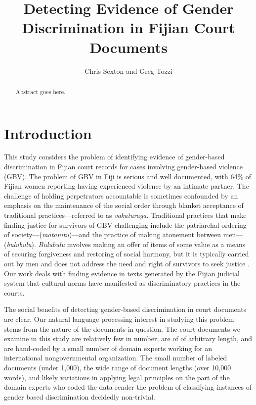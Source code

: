 \documentclass[twocolumn,10pt]{wmrDoc}
\title{Detecting Evidence of Gender Discrimination in Fijian Court Documents}
\author{Chris Sexton and Greg Tozzi
    \affiliation{
    School of Information\\
	University of California, Berkeley\\
    email: cjsexton, greg.tozzi@ischool.berkeley.edu
    }	
}
\begin{document}
\maketitle    
\begin{abstract}
{\it 

Abstract goes here. 

}
\end{abstract}

\section{Introduction}
This study considers the problem of identifying evidence of gender-based discrimination in Fijian court records for cases involving gender-based violence (GBV).  The problem of GBV in Fiji is serious and well documented, with 64\% of Fijian women reporting having experienced violence by an intimate partner.  The challenge of holding perpetrators accountable is sometimes confounded by an emphasis on the maintenance of the social order through blanket acceptance of traditional practices---referred to as \emph{vakaturaga}.  Traditional practices that make finding justice for survivors of GBV challenging include the patriarchal ordering of society---(\emph{matanitu})---and the practice of making atonement between men---(\emph{bulubulu}).  \emph{Bulubulu} involves making an offer of items of some value as a means of securing forgiveness and restoring of social harmony, but it is typically carried out by men and does not address the need and right of survivors to seek justice \cite{newland}.  Our work deals with finding evidence in texts generated by the Fijian judicial system that cultural norms have manifested as discriminatory practices in the courts.

The social benefits of detecting gender-based discrimination in court documents are clear.  Our natural language processing interest in studying this problem stems from the nature of the documents in question.  The court documents we examine in this study are relatively few in number, are of of arbitrary length, and are hand-coded by a small number of domain experts working for an international nongovernmental organization.  The small number of labeled documents (under 1,000), the wide range of document lengths (over 10,000 words), and likely variations in applying legal principles on the part of the domain experts who coded the data render the problem of classifying instances of gender based discrimination decidedly non-trivial.
\end{document}
